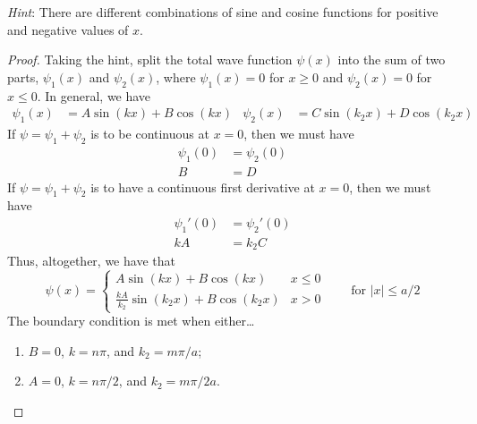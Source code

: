 \documentclass[../psets.tex]{subfiles}
\begin{document}
\begin{enumerate}
\begin{enumerate}
        \emph{Hint}: There are different combinations of sine and cosine functions for positive and negative values of $x$.
        \begin{proof}
            Taking the hint, split the total wave function $\psi(x)$ into the sum of two parts, $\psi_1(x)$ and $\psi_2(x)$, where $\psi_1(x)=0$ for $x\geq 0$ and $\psi_2(x)=0$ for $x\leq 0$. In general, we have
            \begin{align*}
                \psi_1(x) &= A\sin(kx)+B\cos(kx)&
                \psi_2(x) &= C\sin(k_2x)+D\cos(k_2x)
            \end{align*}
            If $\psi=\psi_1+\psi_2$ is to be continuous at $x=0$, then we must have
            \begin{align*}
                \psi_1(0) &= \psi_2(0)\\
                B &= D
            \end{align*}
            If $\psi=\psi_1+\psi_2$ is to have a continuous first derivative at $x=0$, then we must have
            \begin{align*}
                \psi_1'(0) &= \psi_2'(0)\\
                kA &= k_2C
            \end{align*}
            Thus, altogether, we have that
            \begin{equation*}
                \psi(x) =
                \begin{cases}
                    A\sin(kx)+B\cos(kx) & x\leq 0\\
                    \frac{kA}{k_2}\sin(k_2x)+B\cos(k_2x) & x>0
                \end{cases}
                \qquad\text{for }|x|\leq a/2
            \end{equation*}
            The boundary condition is met when either\dots
            \begin{enumerate}
                \item $B=0$, $k=n\pi$, and $k_2=m\pi/a$;
                \item $A=0$, $k=n\pi/2$, and $k_2=m\pi/2a$.
            \end{enumerate}
        \end{proof}

\end{enumerate}
\end{enumerate}
\end{document}
